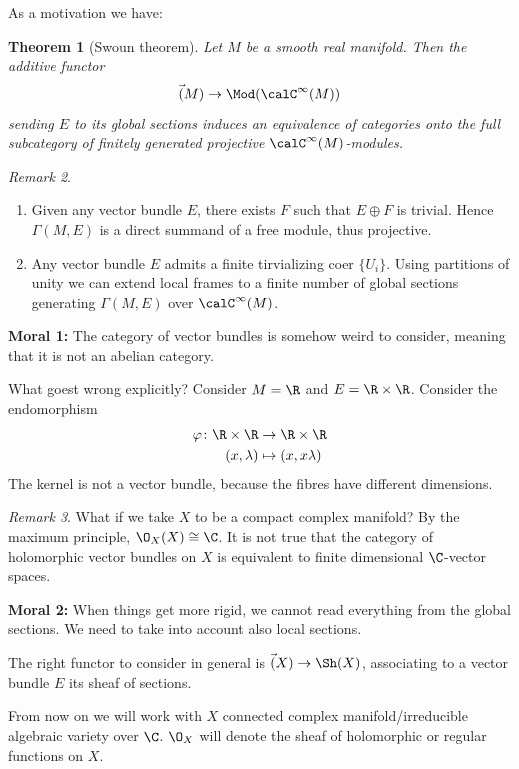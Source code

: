 \documentclass[A4paper, british]{amsart}
\theoremstyle{darkgreentheorem}
\newtheorem{thm}{Theorem}[section]
\theoremstyle{darkbluedefinition}
\theoremstyle{darkredexample}
\theoremstyle{remark}
\newtheorem{rem}[thm]{Remark}
\newcommand{\1}{\mathbbm{1}}
\newcommand{\op}{\oplus}
\newcommand{\tms}{\times}
\begin{document}
As a motivation we have:

\begin{thm}[Swoun theorem]
    Let $M$ be a smooth real manifold.
    Then the additive functor
    \[ \Vec(M)\to \Mod(\calC^{\infty}(M)) \]
    sending $E$ to its global sections induces an equivalence of categories onto the full subcategory of finitely generated projective $\calC^{\infty}(M)$-modules.
\end{thm}

\begin{rem}
    \begin{enumerate}
	\item Given any vector bundle $E$, there exists $F$ such that $E\op F$ is trivial.
	    Hence $\Gamma(M,E)$ is a direct summand of a free module, thus projective.
	\item Any vector bundle $E$ admits a finite tirvializing coer $\{U_{i}\}$.
	    Using partitions of unity we can extend local frames to a finite number of global sections generating $\Gamma(M,E)$ over $\calC^{\infty}(M)$.
    \end{enumerate}
\end{rem}

\textbf{Moral 1:} The category of vector bundles is somehow weird to consider, meaning that it is not an abelian category.

What goest wrong explicitly? Consider $M=\R$ and $E=\R\tms \R$.
Consider the endomorphism
\begin{align*}
    \varphi\colon\R\tms\R&\to \R\tms \R \\
    (x,\lambda)&\mapsto (x,x\lambda)
\end{align*}
The kernel is not a vector bundle, because the fibres have different dimensions.

\begin{rem}
    What if we take $X$ to be a compact complex manifold?
    By the maximum principle, $\O_{X}(X)\cong \C$.
    It is not true that the category of holomorphic vector bundles on $X$ is equivalent to finite dimensional $\C$-vector spaces.
\end{rem}

\textbf{Moral 2:} When things get more rigid, we cannot read everything from the global sections.
We need to take into account also local sections.

The right functor to consider in general is $\Vec(X)\to \Sh(X)$, associating to a vector bundle $E$ its sheaf of sections.

From now on we will work with $X$ connected complex manifold/irreducible algebraic variety over $\C$.
$\O_{X}$ will denote the sheaf of holomorphic or regular functions on $X$.
\end{document}
